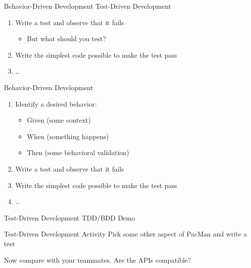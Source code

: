 \documentclass{beamer}
\begin{document}
\begin{frame}{Behavior-Driven Development}
Test-Driven Development
\begin{enumerate}
\item Write a test and observe that it fails
\begin{itemize}
\item But what should you test?
\end{itemize}
\item Write the simplest code possible to make the test pass
\item \ldots
\end{enumerate}

\bigskip
\pause
Behavior-Driven Development
\begin{enumerate}
\item Identify a desired behavior:
\begin{itemize}
\item Given (some context)
\item When (something happens)
\item Then (some behavioral validation)
\end{itemize}
\item Write a test and observe that it fails
\item Write the simplest code possible to make the test pass
\item \ldots
\end{enumerate}
\end{frame}

\begin{frame}{Test-Driven Development}
\centering
\Huge TDD/BDD Demo
\end{frame}

\begin{frame}{Test-Driven Development Activity}
\centering
Pick some other aspect of PacMan and write a test

\pause
\bigskip
\noindent
Now compare with your teammates. Are the APIs compatible?
\end{frame}
\end{document}
